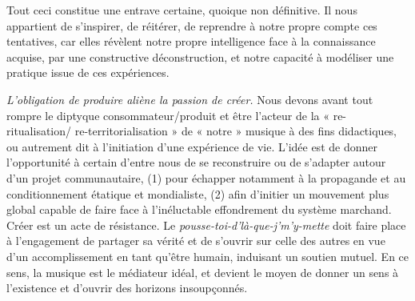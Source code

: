 Tout ceci constitue une entrave certaine, quoique non définitive. Il nous appartient de s’inspirer, de réitérer, de reprendre à notre propre compte ces tentatives, car elles révèlent notre propre intelligence face à la connaissance acquise, par une constructive déconstruction, et notre capacité à modéliser une pratique issue de ces expériences.

\bigskip

\textit{L’obligation de produire aliène la passion de créer. 
}%
Nous devons avant tout rompre le diptyque consommateur/produit et être l'acteur de la « re-ritualisation/ re-territorialisation » de « notre » musique à des fins didactiques, ou autrement dit à l'initiation d'une expérience de vie.
%
L’idée est de donner l’opportunité à certain d’entre nous de se reconstruire ou de s’adapter autour d’un projet communautaire, (1) pour échapper notamment à la propagande et au conditionnement étatique et mondialiste, (2) afin d’initier un mouvement plus global capable de faire face à l’inéluctable effondrement du système marchand. Créer est un acte de résistance. Le \textit{pousse-toi-d'là-que-j'm'y-mette} doit faire place à l'engagement de partager sa vérité et de s'ouvrir sur celle des autres en vue d'un accomplissement en tant qu'être humain, induisant un soutien mutuel. En ce sens, la musique est le médiateur idéal, et devient le moyen de donner un sens à l’existence et d'ouvrir des horizons insoupçonnés. 

\bigskip

